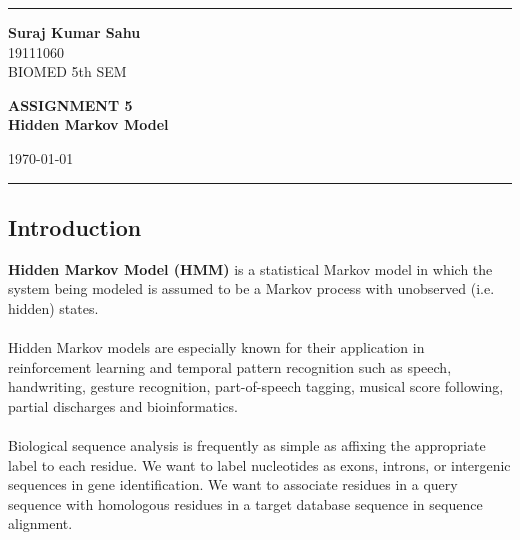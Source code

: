 \documentclass[12pt,a4paper]{article}
\begin{document}
    
    \hrule \medskip %
    \begin{minipage}{0.3\textwidth}
    \raggedright
    \small
    \textbf{Suraj Kumar Sahu}
    \\
    19111060
    \\
    BIOMED 5th SEM
    
    \end{minipage}
    \begin{minipage}{0.45\textwidth} 
    \centering 
    \large 
    \textbf{ASSIGNMENT 5}\\
    \normalsize 
    \textbf{Hidden Markov Model}\\ 
    \end{minipage}
    \begin{minipage}{0.2\textwidth}
    \raggedleft
    \today\hfill\\
    \end{minipage}
    \medskip\hrule 
    \bigskip

\subsection*{Introduction}
\textbf{Hidden Markov Model (HMM)} is a statistical Markov model in which the system being modeled is assumed to be a Markov process with unobserved (i.e. hidden) states.
\\
\\
Hidden Markov models are especially known for their application in reinforcement learning and temporal pattern recognition such as speech, handwriting, gesture recognition, part-of-speech tagging, musical score following, partial discharges and bioinformatics.
\\
\\
Biological sequence analysis is frequently as simple as affixing the appropriate label to each residue. We want to label nucleotides as exons, introns, or intergenic sequences in gene identification. We want to associate residues in a query sequence with homologous residues in a target database sequence in sequence alignment. 
\end{document}
